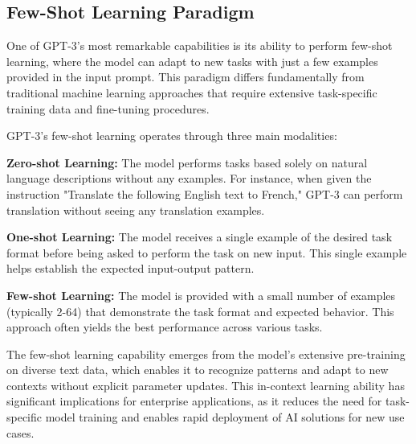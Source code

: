 \subsection{Few-Shot Learning Paradigm}

One of GPT-3's most remarkable capabilities is its ability to perform few-shot learning, where the model can adapt to new tasks with just a few examples provided in the input prompt. This paradigm differs fundamentally from traditional machine learning approaches that require extensive task-specific training data and fine-tuning procedures.


GPT-3's few-shot learning operates through three main modalities:

\textbf{Zero-shot Learning:} The model performs tasks based solely on natural language descriptions without any examples. For instance, when given the instruction "Translate the following English text to French," GPT-3 can perform translation without seeing any translation examples.

\textbf{One-shot Learning:} The model receives a single example of the desired task format before being asked to perform the task on new input. This single example helps establish the expected input-output pattern.

\textbf{Few-shot Learning:} The model is provided with a small number of examples (typically 2-64) that demonstrate the task format and expected behavior. This approach often yields the best performance across various tasks.


The few-shot learning capability emerges from the model's extensive pre-training on diverse text data, which enables it to recognize patterns and adapt to new contexts without explicit parameter updates. This in-context learning ability has significant implications for enterprise applications, as it reduces the need for task-specific model training and enables rapid deployment of AI solutions for new use cases.


